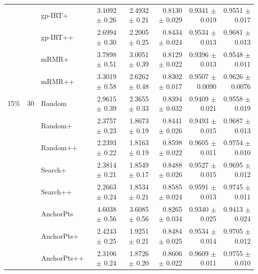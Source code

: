 \begin{longtable}{llp{}rrrrr}
 &  & gp-IRT+ & 3.1092 {\scriptsize $\pm$ 0.26} & 2.4932 {\scriptsize $\pm$ 0.21} & 0.8130 {\scriptsize $\pm$ 0.029} & 0.9341 {\scriptsize $\pm$ 0.019} & 0.9551 {\scriptsize $\pm$ 0.017} \\
 &  & gp-IRT++ & 2.6994 {\scriptsize $\pm$ 0.30} & 2.2005 {\scriptsize $\pm$ 0.25} & 0.8434 {\scriptsize $\pm$ 0.024} & 0.9534 {\scriptsize $\pm$ 0.013} & 0.9681 {\scriptsize $\pm$ 0.013} \\
 &  & mRMR+ & 3.7898 {\scriptsize $\pm$ 0.51} & 3.0051 {\scriptsize $\pm$ 0.39} & 0.8129 {\scriptsize $\pm$ 0.022} & 0.9396 {\scriptsize $\pm$ 0.013} & 0.9548 {\scriptsize $\pm$ 0.011} \\
 &  & mRMR++ & 3.3019 {\scriptsize $\pm$ 0.58} & 2.6262 {\scriptsize $\pm$ 0.48} & 0.8302 {\scriptsize $\pm$ 0.017} & 0.9507 {\scriptsize $\pm$ 0.0090} & 0.9626 {\scriptsize $\pm$ 0.0076} \\
\midrule
15\% & 30 & Random & 2.9615 {\scriptsize $\pm$ 0.39} & 2.3655 {\scriptsize $\pm$ 0.33} & 0.8394 {\scriptsize $\pm$ 0.032} & 0.9409 {\scriptsize $\pm$ 0.021} & 0.9558 {\scriptsize $\pm$ 0.019} \\
 &  & Random+ & 2.3757 {\scriptsize $\pm$ 0.23} & 1.8673 {\scriptsize $\pm$ 0.19} & 0.8441 {\scriptsize $\pm$ 0.026} & 0.9493 {\scriptsize $\pm$ 0.015} & 0.9687 {\scriptsize $\pm$ 0.013} \\
 &  & Random++ & 2.2393 {\scriptsize $\pm$ 0.22} & 1.8163 {\scriptsize $\pm$ 0.19} & 0.8598 {\scriptsize $\pm$ 0.022} & 0.9605 {\scriptsize $\pm$ 0.011} & 0.9754 {\scriptsize $\pm$ 0.010} \\
 &  & Search+ & 2.3814 {\scriptsize $\pm$ 0.21} & 1.8549 {\scriptsize $\pm$ 0.17} & 0.8488 {\scriptsize $\pm$ 0.026} & 0.9527 {\scriptsize $\pm$ 0.015} & 0.9695 {\scriptsize $\pm$ 0.012} \\
 &  & Search++ & 2.2663 {\scriptsize $\pm$ 0.24} & 1.8534 {\scriptsize $\pm$ 0.21} & 0.8585 {\scriptsize $\pm$ 0.024} & 0.9591 {\scriptsize $\pm$ 0.013} & 0.9745 {\scriptsize $\pm$ 0.011} \\
 &  & AnchorPts & 4.6038 {\scriptsize $\pm$ 0.56} & 3.6085 {\scriptsize $\pm$ 0.56} & 0.8265 {\scriptsize $\pm$ 0.034} & 0.9340 {\scriptsize $\pm$ 0.025} & 0.9413 {\scriptsize $\pm$ 0.024} \\
 &  & AnchorPts+ & 2.4243 {\scriptsize $\pm$ 0.25} & 1.9251 {\scriptsize $\pm$ 0.21} & 0.8484 {\scriptsize $\pm$ 0.025} & 0.9534 {\scriptsize $\pm$ 0.014} & 0.9705 {\scriptsize $\pm$ 0.012} \\
 &  & AnchorPts++ & 2.3106 {\scriptsize $\pm$ 0.24} & 1.8726 {\scriptsize $\pm$ 0.20} & 0.8606 {\scriptsize $\pm$ 0.022} & 0.9609 {\scriptsize $\pm$ 0.011} & 0.9755 {\scriptsize $\pm$ 0.010} \\

\end{longtable}
